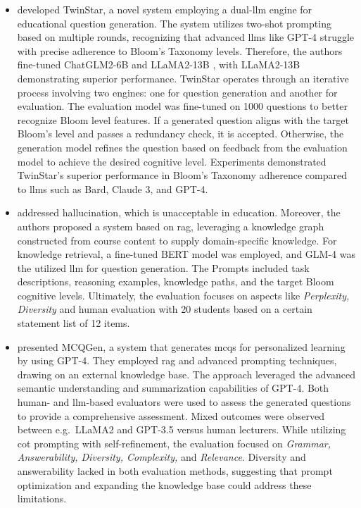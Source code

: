 \begin{itemize}
    \item \cite{zhuge_twinstar_2025} developed TwinStar, a novel system employing a dual-\ac{llm} engine for educational question generation. The system utilizes two-shot prompting based on multiple rounds, recognizing that advanced \ac{llms} like GPT-4 struggle with precise adherence to Bloom's Taxonomy levels. Therefore, the authors fine-tuned ChatGLM2-6B \cite{glm_chatglm_2024} and LLaMA2-13B \cite{touvron_llama_2023-1}, with LLaMA2-13B demonstrating superior performance. TwinStar operates through an iterative process involving two engines: one for question generation and another for evaluation. The evaluation model was fine-tuned on 1000 questions to better recognize Bloom level features. If a generated question aligns with the target Bloom's level and passes a redundancy check, it is accepted. Otherwise, the generation model refines the question based on feedback from the evaluation model to achieve the desired cognitive level. Experiments demonstrated TwinStar's superior performance in Bloom's Taxonomy adherence compared to \ac{llms} such as Bard, Claude 3, and GPT-4.
    \item \cite{yang_heuristic_2024} addressed hallucination, which is unacceptable in education. Moreover, the authors proposed a system based on \ac{rag}, leveraging a knowledge graph constructed from course content to supply domain-specific knowledge. For knowledge retrieval, a fine-tuned BERT model was employed, and GLM-4 \cite{glm_chatglm_2024} was the utilized \ac{llm} for question generation. The Prompts included task descriptions, reasoning examples, knowledge paths, and the target Bloom cognitive levels. Ultimately, the evaluation focuses on aspects like \textit{Perplexity, Diversity} and human evaluation with 20 students based on a certain statement list of 12 items.
    \item \cite{hang_mcqgen_2024} presented MCQGen, a system that generates \ac{mcqs} for personalized learning by using GPT-4. They employed \ac{rag} and advanced prompting techniques, drawing on an external knowledge base. The approach leveraged the advanced semantic understanding and summarization capabilities of GPT-4. Both human- and \ac{llm}-based evaluators were used to assess the generated questions to provide a comprehensive assessment. Mixed outcomes were observed between e.g.\ LLaMA2 and GPT-3.5 versus human lecturers. While utilizing \ac{cot} prompting with self-refinement, the evaluation focused on \textit{Grammar, Answerability, Diversity, Complexity,} and \textit{Relevance}. Diversity and answerability lacked in both evaluation methods, suggesting that prompt optimization and expanding the knowledge base could address these limitations. 
\end{itemize}

